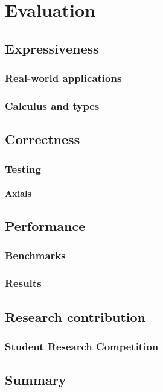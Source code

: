 \chapter{Evaluation}

\section{Expressiveness}

\subsection{Real-world applications}

\subsection{Calculus and types}

\section{Correctness}

\subsection{Testing}

\subsubsection{Axials}

\section{Performance}

\subsection{Benchmarks}

\subsection{Results}

\section{Research contribution}

\subsection{Student Research Competition}

\section{Summary}
